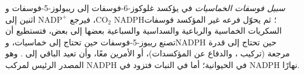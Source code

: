 \begin{definition}\label{def:b1:biosyntheses-integration:ppp}
\emph{سبيل فوسفات الخماسيات} في  يؤكسد
غلوكوز-6-فوسفات إلى ريبولوز-5-فوسفات و$\mathrm{CO_2}$، فيرجع
$\mathrm{NADP^+}$ اثنين إلى NADPH؛ ثم يحوّل فرعه غير المؤكسد فوسفات
السكريات الخماسية والرباعية والسداسية والسباعية بعضها إلى بعض، فتستطيع
 أن تصنع ريبوز-5-فوسفات  حين تحتاج إلى خماسيات،
وNADPH حين تحتاج إلى قدرة مرجعة (تركيب ، والدفاع عن المؤكسدات)،
أو الأمرين معًا، وأن تعيد الباقي إلى . وهو المصدر الرئيس
لمركب NADPH في  الحيوانية؛ أما في النبات فتزود  في
 NADPH نهارًا.
\end{definition}

